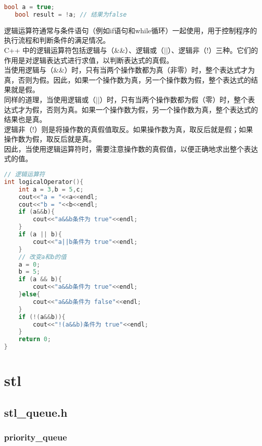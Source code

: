 \documentclass[12pt,twiside,a4paper]{ctexbook}
\numberwithin{chapter}{part}
\begin{document}
\begin{lstlisting}[language=C++]
   bool a = true;
   bool result = !a; // 结果为false
\end{lstlisting}
逻辑运算符通常与条件语句（例如if语句和while循环）一起使用，用于控制程序的执行流程和判断条件的满足情况。\\
C++ 中的逻辑运算符包括逻辑与（\&\&）、逻辑或（||）、逻辑非（!）三种。它们的作用是对逻辑表达式进行求值，以判断表达式的真假。\\
当使用逻辑与（\&\&）时，只有当两个操作数都为真（非零）时，整个表达式才为真，否则为假。因此，如果一个操作数为真，另一个操作数为假，整个表达式的结果就是假。\\
同样的道理，当使用逻辑或（||）时，只有当两个操作数都为假（零）时，整个表达式才为假，否则为真。如果一个操作数为假，另一个操作数为真，整个表达式的结果也是真。\\
逻辑非（!）则是将操作数的真假值取反。如果操作数为真，取反后就是假；如果操作数为假，取反后就是真。\\
因此，当使用逻辑运算符时，需要注意操作数的真假值，以便正确地求出整个表达式的值。
\begin{lstlisting}[language=C++]
// 逻辑运算符
int logicalOperator(){
	int a = 3,b = 5,c;
	cout<<"a = "<<a<<endl;
	cout<<"b = "<<b<<endl;
	if (a&&b){
		cout<<"a&&b条件为 true"<<endl;
	}
	if (a || b){
		cout<<"a||b条件为 true"<<endl;
	}
	// 改变a和b的值
	a = 0;
	b = 5;
	if (a && b){
		cout<<"a&&b条件为 true"<<endl;
	}else{
		cout<<"a&&b条件为 false"<<endl;
	}
	if (!(a&&b)){
		cout<<"!(a&&b)条件为 true"<<endl;
	}
	return 0;
}
\end{lstlisting}

\chapter{stl}
\section{stl\_queue.h}
\subsection{priority\_queue}
\end{document}
